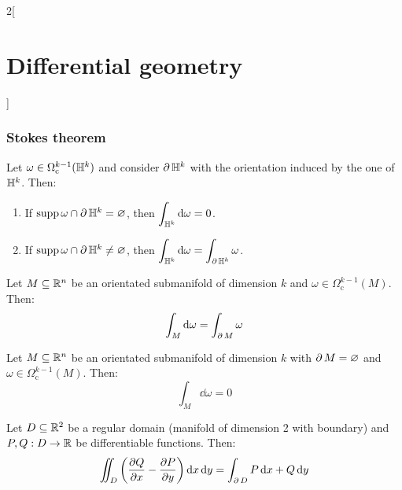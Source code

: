 \documentclass[../../../main_math.tex]{subfiles}
\begin{document}
\begin{multicols}{2}[\section{Differential geometry}]
  \subsubsection{Stokes theorem}
  \begin{proposition}
    Let $\omega\in\Omega_\text{c}^{k-1}(\mathbb{H}^k)$ and consider $\operatorname{\partial}{\mathbb{H}^k}$ with the orientation induced by the one of $\mathbb{H}^k$. Then:
    \begin{enumerate}
      \item If $\operatorname{supp}{\omega}\cap \operatorname{\partial}{\mathbb{H}^k}=\varnothing$, then $\displaystyle\int_{\mathbb{H}^k}\dd{\omega}=0$.
      \item If $\operatorname{supp}{\omega}\cap \operatorname{\partial}{\mathbb{H}^k}\ne\varnothing$, then $\displaystyle\int_{\mathbb{H}^k}\dd{\omega}=\int_{\operatorname{\partial}{\mathbb{H}^k}}\omega$.
    \end{enumerate}
  \end{proposition}
  \begin{theorem}
    Let $M\subseteq\mathbb{R}^n$ be an orientated submanifold of dimension $k$ and $\omega\in\Omega_\text{c}^{k-1}(M)$. Then: $$\int_M\dd{\omega}=\int_{\operatorname{\partial}{M}}\omega$$
  \end{theorem}
  \begin{corollary}
    Let $M\subseteq\mathbb{R}^n$ be an orientated submanifold of dimension $k$ with $\operatorname{\partial}{M}=\varnothing$ and $\omega\in\Omega_\text{c}^{k-1}(M)$. Then: $$\int_M\dd{\omega}=0$$
  \end{corollary}
  \begin{corollary}
    Let $D\subseteq\mathbb{R}^2$ be a regular domain (manifold of dimension 2 with boundary) and $P,Q:D\rightarrow\mathbb{R}$ be differentiable functions. Then: $$\iint_D\left(\pdv{Q}{x}-\pdv{P}{y}\right)\dd{x}\dd{y}=\int_{\operatorname{\partial}{D}}P\dd{x}+Q\dd{y}$$
  \end{corollary}

\end{multicols}
\end{document}
